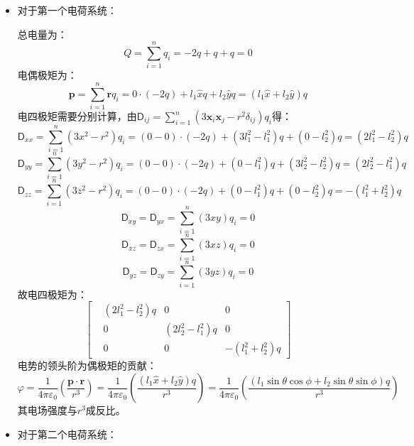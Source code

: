 \documentclass[a4paper,fontset=none]{ctexart}
\begin{document}
    \begin{itemize}

        \item[3.(1)]
        对于第一个电荷系统：

        总电量为：
        \[
        Q = \sum_{i=1}^n q_i = -2q + q + q = 0
        \]
        电偶极矩为：
        \[
        \bm{p} = \sum_{i=1}^n \bm{r}q_i = 0\cdot(-2q) + l_1\hat{x}q + l_2\hat{y}q = (l_1\hat{x} + l_2\hat{y})q
        \]
        电四极矩需要分别计算，由$\mathsf{D}_{ij}=\sum\limits_{i=1}^n (3\bm{x}_i\bm{x}_j - r^2\delta_{ij})q_i$得：
        \[
        \mathsf{D}_{xx} = \sum_{i=1}^n (3x^2 - r^2)q_i = (0-0)\cdot(-2q) + (3l_1^2-l_1^2)q + (0-l_2^2)q = (2l_1^2-l_2^2)q
        \]
        \[
        \mathsf{D}_{yy} = \sum_{i=1}^n (3y^2 - r^2)q_i = (0-0)\cdot(-2q) + (0-l_1^2)q + (3l_2^2-l_2^2)q = (2l_2^2-l_1^2)q
        \]
        \[
        \mathsf{D}_{zz} = \sum_{i=1}^n (3z^2 - r^2)q_i = (0-0)\cdot(-2q) + (0-l_1^2)q + (0-l_2^2)q = -(l_1^2+l_2^2)q
        \]
        \[
        \mathsf{D}_{xy} = \mathsf{D}_{yx} = \sum_{i=1}^n (3xy)q_i = 0
        \]
        \[
        \mathsf{D}_{xz} = \mathsf{D}_{zx} = \sum_{i=1}^n (3xz)q_i = 0
        \]
        \[
        \mathsf{D}_{yz} = \mathsf{D}_{zy} = \sum_{i=1}^n (3yz)q_i = 0
        \]
        故电四极矩为：
        \[
        \begin{bmatrix}
            & (2l_1^2-l_2^2)q & 0 & 0 \\
            & 0 & (2l_2^2-l_1^2)q & 0 \\
            & 0 & 0 & -(l_1^2+l_2^2)q
        \end{bmatrix}
        \]
        电势的领头阶为偶极矩的贡献：
        \[
        \varphi = \frac{1}{4\pi\varepsilon_0}\left(\frac{\bm{p}\cdot\bm{r}}{r^3}\right) = \frac{1}{4\pi\varepsilon_0}\left(\frac{(l_1\hat{x} + l_2\hat{y})q}{r^3}\right) = \frac{1}{4\pi\varepsilon_0}\left(\frac{(l_1\sin\theta\cos\phi+l_2\sin\theta\sin\phi)q}{r^3}\right)
        \]
        其电场强度与$r^3$成反比。

        \item[3.(2)]
        对于第二个电荷系统：


\end{itemize}
\end{document}
